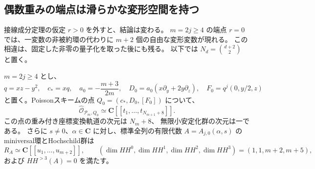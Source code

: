 \subsection{偶数重みの端点は滑らかな変形空間を持つ}
\label{subsec:endpoint-hulls-v36}

接線成分定理の仮定 $r>0$ を外すと、結論は変わる。
$m=2j\ge4$ の端点 $r=0$ では、一変数の非被約環の代わりに
$m+2$ 個の自由な変形変数が現れる。
この相違は、固定した非零の量子化を取った後にも残る。
以下では $N_d=\binom{d+2}{2}$ と置く。

\begin{theorem}[端点の全局所環と固定量子化のhull]
\label{thm:endpoint-hull-v36}
$m=2j\ge4$ とし、
\[
 q=xz-y^2,\quad c_*=xq,\quad
 a_0=-\frac{m+3}{2m},\quad
 D_0=a_0(x\partial_y+2y\partial_z),\quad
 F_0=q^j(0,y/2,z)
\]
と置く。Poissonスキームの点 $Q_0=(c_*,D_0,[F_0])$ について、
\[
 \widehat{\mathcal O}_{\mathscr P_m,Q_0}
 \simeq\mathbf C[[t_1,\ldots,t_{N_{m+1}+8}]].
\]
この点の重み付き座標変換軌道の次元は $N_m+8$、
無限小安定化群の次元は一である。
さらに $s\ne0$、$\alpha\in\mathbf C$ に対し、標準全列の有限代数
$A=A_{j,0}(\alpha,s)$ のminiversal環とHochschild群は
\[
 \boxed{R_A\simeq\mathbf C[[u_1,\ldots,u_{m+2}]]},\qquad
 (\dim HH^0,\dim HH^1,\dim HH^2,\dim HH^3)
       =(1,1,m+2,m+5),
\]
および $HH^{>3}(A)=0$ を満たす。
\end{theorem}

